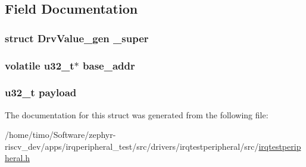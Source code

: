 \subsection{Field Documentation}
\subsubsection[{\texorpdfstring{\+\_\+super}{_super}}]{\setlength{\rightskip}{0pt plus 5cm}struct {\bf Drv\+Value\+\_\+gen} \+\_\+super}\hypertarget{struct_drv_value__uint_ad6a22febddaa20faa4af2f9fed5766f0}{}\label{struct_drv_value__uint_ad6a22febddaa20faa4af2f9fed5766f0}
\subsubsection[{\texorpdfstring{base\+\_\+addr}{base_addr}}]{\setlength{\rightskip}{0pt plus 5cm}volatile u32\+\_\+t$\ast$ base\+\_\+addr}\hypertarget{struct_drv_value__uint_af745320979cc5b64a90dda3de0bb6f9a}{}\label{struct_drv_value__uint_af745320979cc5b64a90dda3de0bb6f9a}
\subsubsection[{\texorpdfstring{payload}{payload}}]{\setlength{\rightskip}{0pt plus 5cm}u32\+\_\+t payload}\hypertarget{struct_drv_value__uint_a162d02c866faff1801fd317ce7edfdd7}{}\label{struct_drv_value__uint_a162d02c866faff1801fd317ce7edfdd7}


The documentation for this struct was generated from the following file\+:\begin{DoxyCompactItemize}
\item 
/home/timo/\+Software/zephyr-\/riscv\+\_\+dev/apps/irqperipheral\+\_\+test/src/drivers/irqtestperipheral/src/\hyperlink{irqtestperipheral_8h}{irqtestperipheral.\+h}\end{DoxyCompactItemize}
